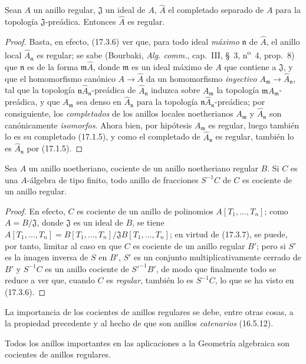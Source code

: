 \begin{lemma}[17.3.8.1]
\label{0.17.3.8.1-fr}
Sean $A$ un anillo regular, $\mathfrak{J}$ un ideal de $A$,
$\widehat{A}$ el completado separado de $A$ para la topología
$\mathfrak{J}$-preádica. Entonces $\widehat{A}$ es regular.
\end{lemma}

\begin{proof}
Basta, en efecto, (17.3.6) ver que, para todo ideal \emph{máximo}
$\mathfrak{n}$ de $\widehat{A}$, el anillo local
$\widehat{A}_{\mathfrak{n}}$ es regular; se sabe (Bourbaki,
\emph{Alg. comm.}, cap.~III, \S~3, n\textsuperscript{o}~4, prop.~8) que
$\mathfrak{n}$
es de la forma $\mathfrak{m}\widehat{A}$, donde $\mathfrak{m}$ es un ideal
máximo de $A$ que contiene a $\mathfrak{J}$, y que el homomorfismo canónico
$A\to\widehat{A}$ da un homomorfismo \emph{inyectivo}
$A_{\mathfrak{m}}\to\widehat{A}_{\mathfrak{n}}$, tal que la topología
$\mathfrak{n}\widehat{A}_{\mathfrak{n}}$-preádica de
$\widehat{A}_{\mathfrak{n}}$ induzca sobre $A_{\mathfrak{m}}$ la topología
$\mathfrak{m}A_{\mathfrak{m}}$-preádica, y que $A_{\mathfrak{m}}$ sea denso
en $\widehat{A}_{\mathfrak{n}}$ para la topología
$\mathfrak{n}\widehat{A}_{\mathfrak{n}}$-preádica; por consiguiente, los
\emph{completados} de los anillos locales noetherianos $A_{\mathfrak{m}}$ y
$\widehat{A}_{\mathfrak{n}}$ son canónicamente \emph{isomorfos}. Ahora bien,
por hipótesis $A_{\mathfrak{m}}$ es regular, luego también lo es su completado
(17.1.5), y como el completado de $\widehat{A}_{\mathfrak{n}}$ es regular,
también lo es $\widehat{A}_{\mathfrak{n}}$ por (17.1.5).
\end{proof}

\begin{corollary}[17.3.9]
\label{0.17.3.9-fr}
Sea $A$ un anillo noetheriano, cociente de un anillo noetheriano regular $B$.
Si $C$ es una $A$-álgebra de tipo finito, todo anillo de fracciones $S^{-1}C$
de $C$ es cociente de un anillo regular.
\end{corollary}

\begin{proof}
En efecto, $C$ es cociente de un anillo de polinomios $A[T_1,\ldots,T_n]$;
como $A=B/\mathfrak{J}$, donde $\mathfrak{J}$ es un ideal de $B$, se tiene
$A[T_1,\ldots,T_n]=B[T_1,\ldots,T_n]/\mathfrak{J}B[T_1,\ldots,T_n]$; en
virtud de (17.3.7), se puede, por tanto, limitar al caso en que $C$ es cociente
de un anillo regular $B'$; pero si $S'$ es la imagen inversa de $S$ en $B'$,
$S'$ es un conjunto multiplicativamente cerrado de $B'$ y $S^{-1}C$ es un anillo
cociente de $S'^{-1}B'$, de modo que finalmente todo se reduce a ver que,
cuando $C$ es \emph{regular}, también lo es $S^{-1}C$, lo que se ha visto en
(17.3.6).
\end{proof}

La importancia de los cocientes de anillos regulares se debe, entre otras
cosas, a la propiedad precedente y al hecho de que son anillos
\emph{catenarios} (16.5.12).

Todos los anillos importantes en las aplicaciones a la Geometría algebraica
son cocientes de anillos regulares.
